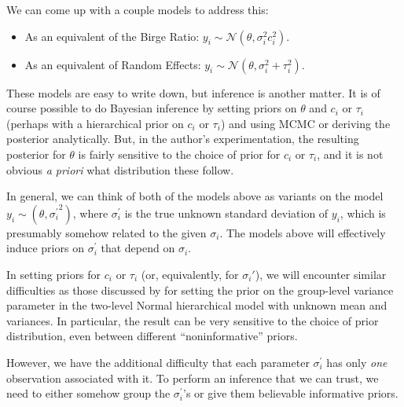 \documentclass[letterpaper,12pt]{article}
\begin{document}
We can come up with a couple models to address this:
\begin{itemize}
  \item As an equivalent of the Birge Ratio: $y_i\sim\mathcal{N}(\theta,\sigma_i^2c_i^2)$.
  \item As an equivalent of Random Effects: $y_i\sim\mathcal{N}(\theta,\sigma_i^2+\tau_i^2)$.
\end{itemize}
These models are easy to write down, but inference is another matter. It is of course possible to do Bayesian inference by setting priors on $\theta$ and $c_i$ or $\tau_i$ (perhaps with a hierarchical prior on $c_i$ or $\tau_i$) and using MCMC or deriving the posterior analytically. But, in the author's experimentation, the resulting posterior for $\theta$ is fairly sensitive to the choice of prior for $c_i$ or $\tau_i$, and it is not obvious \textit{a priori} what distribution these follow.

In general, we can think of both of the models above as variants on the model $y_i\sim(\theta,{\sigma_i^\prime}^2)$, where $\sigma_i^\prime$ is the true unknown standard deviation of $y_i$, which is presumably somehow related to the given $\sigma_i$. The models above will effectively induce priors on $\sigma_i^\prime$ that depend on $\sigma_i$.

In setting priors for $c_i$ or $\tau_i$ (or, equivalently, for $\sigma_i'$), we will encounter similar difficulties as those discussed by \citet{gelman2006prior} for setting the prior on the group-level variance parameter in the two-level Normal hierarchical model with unknown mean and variances. In particular, the result can be very sensitive to the choice of prior distribution, even between different ``noninformative'' priors.

However, we have the additional difficulty that each parameter $\sigma_i^\prime$ has only \textit{one} observation associated with it. To perform an inference that we can trust, we need to either somehow group the $\sigma_i^\prime$'s or give them believable informative priors.
\end{document}
